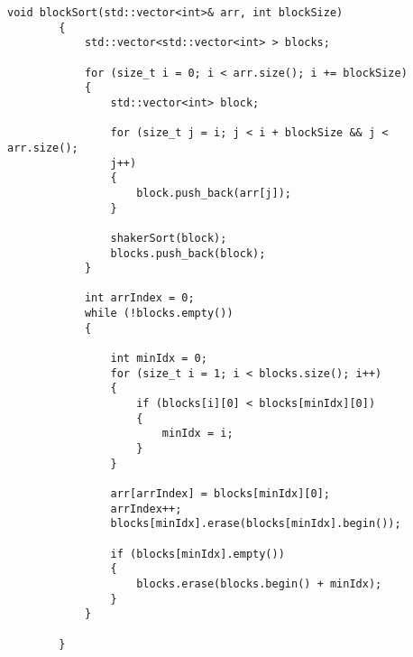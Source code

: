 \begin{appendices}
	\begin{lstlisting}[label=lst:block_sort,caption=Реализация алгоритма блочной сортировки]
		void blockSort(std::vector<int>& arr, int blockSize)
		{
			std::vector<std::vector<int> > blocks;
			
			for (size_t i = 0; i < arr.size(); i += blockSize)
			{
				std::vector<int> block;
				
				for (size_t j = i; j < i + blockSize && j < arr.size();
				j++)
				{
					block.push_back(arr[j]);
				}
				
				shakerSort(block);
				blocks.push_back(block);
			}
			
			int arrIndex = 0;
			while (!blocks.empty())
			{
				
				int minIdx = 0;
				for (size_t i = 1; i < blocks.size(); i++)
				{
					if (blocks[i][0] < blocks[minIdx][0])
					{
						minIdx = i;
					}
				}
				
				arr[arrIndex] = blocks[minIdx][0];
				arrIndex++;
				blocks[minIdx].erase(blocks[minIdx].begin());
				
				if (blocks[minIdx].empty())
				{
					blocks.erase(blocks.begin() + minIdx);
				}
			}
			
		}
	\end{lstlisting}
\end{appendices}
	
	
	
